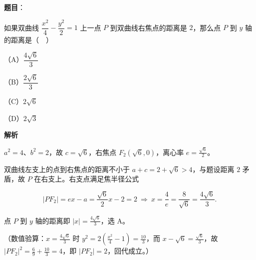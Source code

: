 \begin{answer}

\textbf{题目}：

如果双曲线 $\dfrac{x^2}{4}-\dfrac{y^2}{2}=1$ 上一点 $P$ 到双曲线右焦点的距离是 $2$，那么点 $P$ 到 $y$ 轴的距离是（　）

（A）$\dfrac{4\sqrt6}{3}$

（B）$\dfrac{2\sqrt6}{3}$

（C）$2\sqrt6$

（D）$2\sqrt3$

\textbf{解析}

$a^{2}=4$、$b^{2}=2$，故 $c=\sqrt6$，右焦点 $F_2(\sqrt6,0)$，离心率 $e=\frac{\sqrt6}{2}$。

双曲线左支上的点到右焦点的距离不小于 $a+c=2+\sqrt6>4$，与题设距离 $2$ 矛盾，故 $P$ 在右支上。右支点满足焦半径公式

\nopagebreak[4]
\[|PF_2|=ex-a=\frac{\sqrt6}{2}x-2=2\ \Longrightarrow\ x=\frac{4}{e}=\frac{8}{\sqrt6}=\frac{4\sqrt6}{3}.\]

点 $P$ 到 $y$ 轴的距离即 $|x|=\frac{4\sqrt6}{3}$，选 A。

（数值验算：$x=\frac{4\sqrt6}{3}$ 时 $y^{2}=2\left(\frac{x^{2}}{4}-1\right)=\frac{10}{3}$，而 $x-\sqrt6=\frac{\sqrt6}{3}$，故 $|PF_2|^{2}=\frac{6}{9}+\frac{10}{3}=4$，即 $|PF_2|=2$，回代成立。）


\end{answer}
